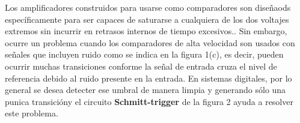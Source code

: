 \documentclass{article}
\begin{document}
\begin{figure}[H]
	\caption{}	
	\label{fig:figura1}
	\end{figure}

Los amplificadores construidos para usarse como comparadores son diseñaods específicamente para ser capaces de saturarse a cualquiera de los dos voltajes extremos sin incurrir en retrasos internos de tiempo excesivos.. Sin embargo, ocurre un problema cuando los comparadores de alta velocidad son usados con señales que incluyen ruido como se indica en la figura 1(c), es decir, pueden ocurrir muchas transiciones conforme la señal de entrada cruza el nivel de referencia debido al ruido presente en la entrada. En sistemas digitales, por lo general se desea detecter ese umbral de manera limpia y generando sólo una punica transicióny el circuito \textbf{Schmitt-trigger} de la figura 2 ayuda a resolver este problema. 
\end{document}
